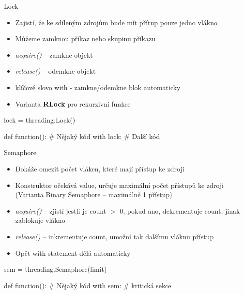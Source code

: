 \documentclass{beamer}
\begin{document}
\begin{frame}[fragile]{Lock}
    \begin{itemize}
            \item Zajistí, že ke sdíleným zdrojům bude mít přítup pouze jedno vlákno
            \item Můžeme zamknou příkaz nebo skupinu příkazu

            \vskip 0.15in
            \item \textit{acquire()} – zamkne objekt
            \item \textit{release()} – odemkne objekt
            \item klíčové slovo with - zamkne/odemkne blok automaticky

            \vskip 0.15in
            \item Varianta \textbf{RLock} pro rekurzivní funkce
    \end{itemize}
    \scriptsize
    \begin{semiverbatim}
    lock = threading.Lock()

    def function():
	    # Nějaký kód
	    with lock:  
	        # Další kód
    \end{semiverbatim}
\end{frame}

\begin{frame}[fragile]{Semaphore}
    \begin{itemize}
        \item Dokáže omezit počet vláken, které mají přístup ke zdroji
        \item Konstruktor očekává value, určuje maximální počet přístupů ke zdroji
        \newline (Varianta Binary Semaphore – maximálně 1 přístup)

        \vskip 0.25in
        \item \textit{acquire()} – zjistí jestli je count $>$ 0, pokud ano, dekrementuje count, jinak zablokuje vlákno
        \item \textit{release()} – inkrementuje count, umožní tak dalšímu vláknu přístup
        \item Opět with statement dělá automaticky
    \end{itemize}
    \scriptsize
    \begin{semiverbatim}
    sem = threading.Semaphore(limit)

    def function():
        # Nějaký kód
        with sem:
            # kritická sekce
    \end{semiverbatim}
\end{frame}
\end{document}
